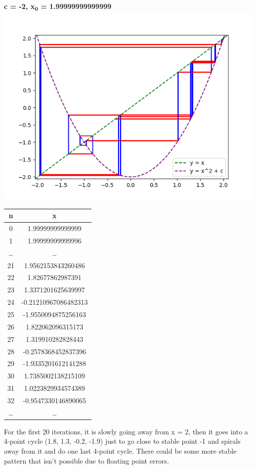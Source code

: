 \documentclass{article}
\begin{document}
\newpage
\begin{center}
    \textbf{c = -2, x\textsubscript{0} = 1.99999999999999}
    \includegraphics[scale=0.8]{3}
    \begin{tabular}{| c | c |}
        \hline
        n & x\\
        \hline
        0 & 1.99999999999999\\
        1 & 1.99999999999996\\
        \dots & \dots \\
        21 & 1.9562153843260486 \\
        \hline
        22 & 1.82677862987391 \\
        23 & 1.3371201625639997\\
        24 & -0.21210967086482313\\
        25 &-1.9550094875256163\\
        \hline
        26 & 1.822062096315173\\
        27 & 1.319910282828443\\
        28 & -0.2578368452837396\\
        29 & -1.9335201612141288\\
        \hline
        30 & 1.7385002138215109\\
        31 &  1.0223829934574389\\
        32 &  -0.9547330146890065\\
        \dots & \dots \\
        \hline
    \end{tabular}
    \end{center}
For the first 20 iterations, it is slowly going away from x = 2, then it goes into a 4-point cycle (1.8, 1.3, -0.2, -1.9) just to go close to stable point -1 and spirals away from it and do one last 4-point cycle. There could be some more stable pattern that isn't possible due to floating point errors.
\end{document}
